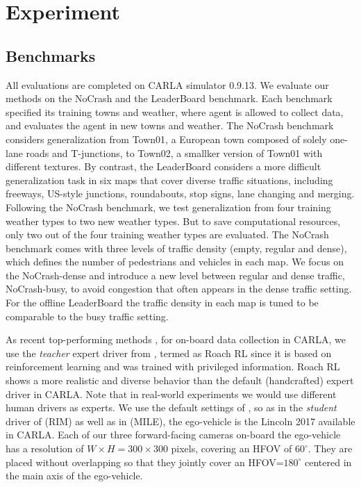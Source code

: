 \section{Experiment}
%	

\subsection{Benchmarks} \label{sec:Dataset}

All evaluations are completed on CARLA simulator \cite{Dosovitskiy:2017} 0.9.13. 
We evaluate our methods on the NoCrash\cite{codevilla2019exploring} and the LeaderBoard benchmark.
Each benchmark specified its training towns and weather, where agent is allowed to collect data, and evaluates the agent in new towns and weather.
The NoCrash benchmark considers generalization from Town01, a European town composed of solely one-lane roads and T-junctions, to Town02, a smallker version of Town01 with different textures.
By contrast, the LeaderBoard considers a more difficult generalization task in six maps that cover diverse traffic situations, including freeways, US-style junctions, roundabouts, stop signs, lane changing and merging.
Following the NoCrash benchmark, we test generalization from four training weather types to two new weather types.
But to save computational resources, only two out of the four training weather types are evaluated.
The NoCrash benchmark comes with three levels of traffic density (empty, regular and dense), which defines the number of pedestrians and vehicles in each map.
We focus on the NoCrash-dense and introduce a new level between regular and dense traffic, NoCrash-busy, to avoid congestion that often appears in the dense traffic setting.
For the offline LeaderBoard the traffic density in each map is tuned to be comparable to the busy traffic setting. 


As recent top-performing methods \cite{Hu:2022}, for on-board data collection in CARLA, we use the \emph{teacher} expert driver from \cite{Zhang:2021}, termed as Roach RL since it is based on reinforcement learning and was trained with privileged information. 
Roach RL shows a more realistic and diverse behavior than the default (handcrafted) expert driver in CARLA. 
Note that in real-world experiments we would use different human drivers as experts. 
We use the default settings of \cite{Zhang:2021}, so as in the \emph{student} driver of \cite{Zhang:2021} (RIM) as well as in \cite{Hu:2022} (MILE), the ego-vehicle is the Lincoln 2017 available in CARLA. 
Each of our three forward-facing cameras on-board the ego-vehicle has a resolution of $W\times H=300\times300$ pixels, covering an HFOV of $60^{\circ}$. 
They are placed without overlapping so that they jointly cover an HFOV=$180^{\circ}$ centered in the main axis of the ego-vehicle. 


